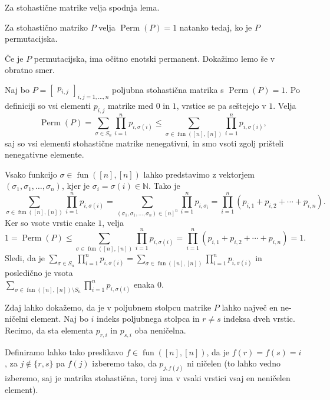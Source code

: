 \documentclass[mat2, tisk]{fmfdelo}
\newcommand{\N}{\mathbb N}
\newcommand{\fun}{\operatorname{fun}}
\newcommand{\funnn}[1]{\fun([#1], [#1])}
\begin{document}
Za stohastične matrike velja spodnja lema.
\begin{lema}
  \label{lema:permanent stohasticne matrike}
  Za stohastično matriko $P$ velja
  $\operatorname{Perm}(P)=1$ natanko tedaj, ko je $P$ permutacijska.
\end{lema}
\begin{dokaz}
  Če je $P$ permutacijska, ima očitno enotski permanent.
  Dokažimo lemo še v obratno smer.

  Naj bo $P =
  \begin{bmatrix}
    p_{i,j}
  \end{bmatrix}_{i,j=1,\dotsc, n}$ poljubna stohastična
  matrika s $\operatorname{Perm}(P) = 1$. Po definiciji
  so vsi elementi  $p_{i,j}$ matrike med $0$ in $1$,
  vrstice se pa seštejejo v $1$.
  Velja
  $$
  \operatorname{Perm}(P) = \sum_{\sigma  \in S_n}
  \prod_{i=1}^n p_{i, \sigma(i)} \leq \sum_{\sigma  \in
  \funnn{n}} \prod_{i=1}^n p_{i, \sigma(i)},
  $$
  saj so vsi elementi stohastične matrike nenegativni, in
  smo vsoti zgolj prišteli nenegativne elemente.

  Vsako funkcijo $\sigma \in \funnn{n}$ lahko predstavimo
  z vektorjem $(\sigma_1, \sigma_1, \dotsc, \sigma_n)$,
  kjer je $\sigma_i = \sigma(i) \in \N$. Tako je
  $$
  \sum_{\sigma  \in \funnn{n}} \prod_{i=1}^n p_{i, \sigma(i)} =
  \sum_{(\sigma_1, \sigma_1, \dotsc, \sigma_n) \in [n]^n}
  \prod_{i=1}^n p_{i, \sigma_i} =
  \prod_{i=1}^n (p_{i, 1} + p_{i, 2} + \dotsm + p_{i, n}).
  $$
  Ker so vsote vrstic enake $1$, velja
  $$
  1 = \operatorname{Perm}(P) \leq  \sum_{\sigma  \in
  \funnn{n}} \prod_{i=1}^n p_{i, \sigma(i)} =
  \prod_{i=1}^n (p_{i, 1} + p_{i, 2} + \dotsm + p_{i, n}) = 1.
  $$
  Sledi, da je  $\sum_{\sigma  \in S_n}  \prod_{i=1}^n
  p_{i, \sigma(i)} =  \sum_{\sigma  \in \funnn{n}}
  \prod_{i=1}^n p_{i, \sigma(i)} $ in posledično je vsota
  \\
  $
  \sum_{\sigma  \in \funnn{n} \setminus S_n}
  \prod_{i=1}^n p_{i, \sigma(i)}
  $ enaka $0$.

  Zdaj lahko dokažemo, da je  v poljubnem stolpcu matrike
  $P$ lahko največ en ne-ničelni element. Naj bo $i$
  indeks poljubnega stolpca in $r \neq s$ indeksa dveh
  vrstic. Recimo, da sta elementa $p_{r, i}$ in $p_{s,i}$
  oba neničelna.

  Definiramo lahko tako preslikavo $f \in \funnn{n}$, da
  je $f(r) = f(s) = i$, za $j \notin \{r, s\}$ pa $f(j)$
  izberemo tako, da $p_{j, f(j)}$ ni ničelen (to lahko
    vedno izberemo, saj je matrika stohastična, torej ima v
  vsaki vrstici vsaj en neničelen element).


\end{dokaz}
\end{document}
